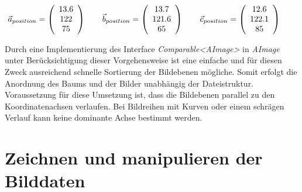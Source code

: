\begin{equation}
\vec{a}_{position}=\left(\begin{array}{c} 13.6 \\ 122 \\ 75 \end{array}\right) \qquad
\vec{b}_{position}=\left(\begin{array}{c} 13.7 \\ 121.6 \\ 65 \end{array}\right) \qquad
\vec{c}_{position}=\left(\begin{array}{c} 12.6 \\ 122.1 \\ 85 \end{array}\right) \qquad
\vspace{0.5cm}
\label{example_sort}
\end{equation}

Durch eine Implementierung des Interface \textit{Comparable\textless AImage\textgreater} in \textit{AImage} unter Berücksichtigung dieser Vorgehensweise ist eine einfache und für diesen Zweck ausreichend schnelle Sortierung der Bildebenen mögliche. Somit erfolgt die Anordnung des Baums und der Bilder unabhängig der Dateistruktur.\\
Voraussetzung für diese Umsetzung ist, dass die Bildebenen parallel zu den Koordinatenachsen verlaufen. Bei Bildreihen mit Kurven oder einem schrägen Verlauf kann keine dominante Achse bestimmt werden.

\section{Zeichnen und manipulieren der Bilddaten}

